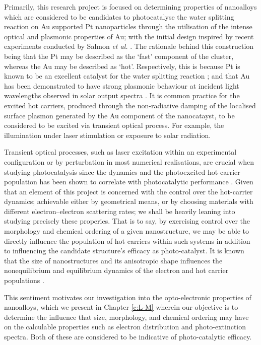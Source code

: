 Primarily, this research project is focused on determining properties of nanoalloys which are considered to be candidates to photocatalyse the water splitting reaction on Au supported Pt nanoparticles through the utilisation of the intense optical and plasmonic properties of Au; with the initial design inspired by recent experiments conducted by Salmon \textit{et al.} \cite{JorgeStructure}. The rationale behind this construction being that the Pt may be described as the `fast' component of the cluster, whereas the Au may be described as `hot'. Respectively, this is because Pt is known to be an excellent catalyst for the water splitting reaction \cite{PtCatalyst}; and that Au has been demonstrated to have strong plasmonic behaviour at incident light wavelengths observed in solar output spectra \cite{AuTRansfer,SolarToChem}. It is common practice for the excited hot carriers, produced through the non-radiative damping of the localised surface plasmon generated by the Au component of the nanocatayst, to be considered to be excited via transient optical process. For example, the illumination under laser stimulation or exposure to solar radiation.  

Transient optical processes, such as laser excitation within an experimental configuration or by perturbation in most numerical realisations, are crucial when studying photocatalysis since the dynamics and the photoexcited hot-carrier population has been shown to correlate with photocatalytic performance \cite{nano9020217}. Given that an element of this project is concerned with the control over the hot-carrier dynamics; achievable either by geometrical means, or by choosing materials with different electron–electron scattering rates; we shall be heavily leaning into studying precisely these properies. That is to say, by exercising control over the morphology and chemical ordering of a given nanostructure, we may be able to directly influence the population of hot carriers within such systems in addition to influencing the candidate structure's efficacy as photo-catalyst. It is known that the size of nanostructures and its anisotropic shape influences  the  nonequilibrium  and equilibrium dynamics of the electron and hot carrier populations \cite{AnatolyGeometry,Nicholls2019,PhysRevB.69.195416,PhysRevLett.85.2200}. 

This sentiment motivates our investigation into the opto-electronic properties of nanoalloys, which we present in Chapter \ref{c:L-M} wherein our objective is to determine the influence that size, morphology, and chemical ordering may have on the calculable properties such as electron distribution and photo-extinction spectra. Both of these are considered to be indicative of photo-catalytic efficacy.

